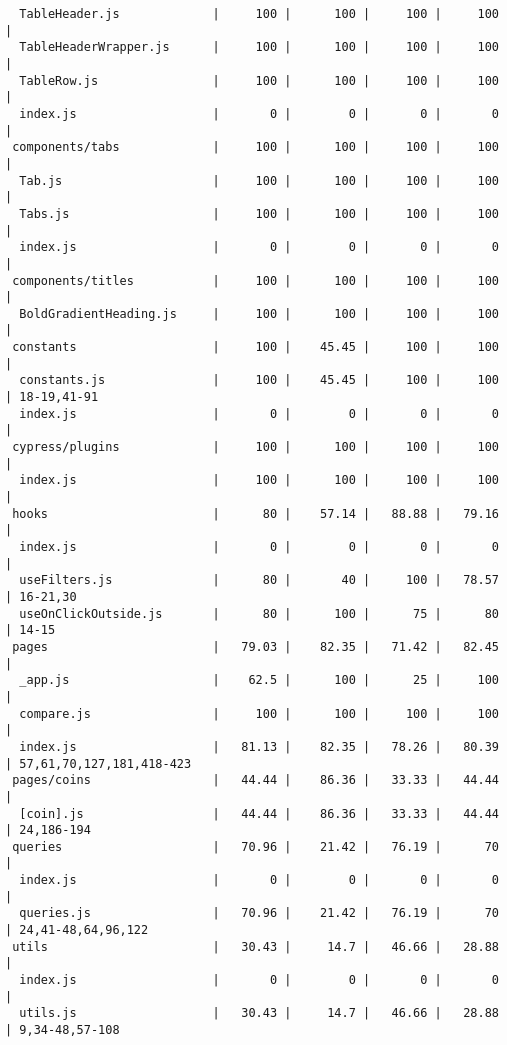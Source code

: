 \documentclass[12pt, titlepage]{article}
\begin{document}
\begin{scriptsize}
\begin{verbatim}
  TableHeader.js             |     100 |      100 |     100 |     100 |                          
  TableHeaderWrapper.js      |     100 |      100 |     100 |     100 |                          
  TableRow.js                |     100 |      100 |     100 |     100 |                          
  index.js                   |       0 |        0 |       0 |       0 |                          
 components/tabs             |     100 |      100 |     100 |     100 |                          
  Tab.js                     |     100 |      100 |     100 |     100 |                          
  Tabs.js                    |     100 |      100 |     100 |     100 |                          
  index.js                   |       0 |        0 |       0 |       0 |                          
 components/titles           |     100 |      100 |     100 |     100 |                          
  BoldGradientHeading.js     |     100 |      100 |     100 |     100 |                          
 constants                   |     100 |    45.45 |     100 |     100 |                          
  constants.js               |     100 |    45.45 |     100 |     100 | 18-19,41-91              
  index.js                   |       0 |        0 |       0 |       0 |                          
 cypress/plugins             |     100 |      100 |     100 |     100 |                          
  index.js                   |     100 |      100 |     100 |     100 |                          
 hooks                       |      80 |    57.14 |   88.88 |   79.16 |                          
  index.js                   |       0 |        0 |       0 |       0 |                          
  useFilters.js              |      80 |       40 |     100 |   78.57 | 16-21,30                 
  useOnClickOutside.js       |      80 |      100 |      75 |      80 | 14-15                    
 pages                       |   79.03 |    82.35 |   71.42 |   82.45 |                          
  _app.js                    |    62.5 |      100 |      25 |     100 |                          
  compare.js                 |     100 |      100 |     100 |     100 |                          
  index.js                   |   81.13 |    82.35 |   78.26 |   80.39 | 57,61,70,127,181,418-423 
 pages/coins                 |   44.44 |    86.36 |   33.33 |   44.44 |                          
  [coin].js                  |   44.44 |    86.36 |   33.33 |   44.44 | 24,186-194               
 queries                     |   70.96 |    21.42 |   76.19 |      70 |                          
  index.js                   |       0 |        0 |       0 |       0 |                          
  queries.js                 |   70.96 |    21.42 |   76.19 |      70 | 24,41-48,64,96,122       
 utils                       |   30.43 |     14.7 |   46.66 |   28.88 |                          
  index.js                   |       0 |        0 |       0 |       0 |                          
  utils.js                   |   30.43 |     14.7 |   46.66 |   28.88 | 9,34-48,57-108 
\end{verbatim}
\end{scriptsize}
\end{document}

